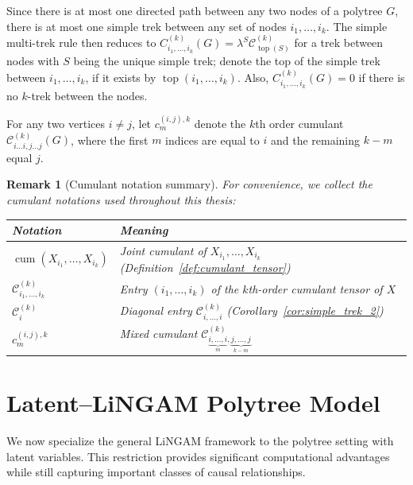 \documentclass[11pt,a4paper]{article}
\numberwithin{equation}{section}
\newtheorem{remark}[theorem]{Remark}
\DeclareMathOperator{\cum}{cum}
\DeclareMathOperator{\ttop}{top}
\begin{document}
Since there is at most one directed path between any two nodes of a polytree $G$, there is at most one simple trek between any set of nodes $i_1,\dots,i_k$. The simple multi-trek rule then reduces to $C^{(k)}_{i_1,\dots,i_k}(G)=\lambda^{S}\mathcal{C}^{(k)}_{\ttop(S)}$ for a trek between nodes with $S$ being the unique simple trek; denote the top of the simple trek between $i_1,\dots,i_k$, if it exists by $\ttop(i_1,\dots,i_k)$. Also, $C^{(k)}_{i_1,\dots,i_k}(G)=0$ if there is no $k$-trek between the nodes.

For any two vertices $i\not=j$, let $c^{(i,j),k}_m$ denote the $k$th order cumulant $\mathcal{C}^{(k)}_{{i\dots i},{j\dots j}}(G)$, where the first $m$ indices are equal to $i$ and the remaining $k-m$ equal $j$.

\begin{remark}[Cumulant notation summary]
\label{rem:notation}
For convenience, we collect the cumulant notations used throughout this thesis:
\begin{center}
\begin{tabular}{ll}
\toprule
Notation & Meaning \\
\midrule
$\cum(X_{i_1},\ldots,X_{i_k})$ & Joint cumulant of $X_{i_1},\ldots,X_{i_k}$ (Definition~\ref{def:cumulant_tensor}) \\
$\mathcal{C}^{(k)}_{i_1,\ldots,i_k}$ & Entry $(i_1,\ldots,i_k)$ of the $k$th-order cumulant tensor of $X$ \\
$\mathcal{C}^{(k)}_i$ & Diagonal entry $\mathcal{C}^{(k)}_{i,\ldots,i}$ (Corollary~\ref{cor:simple_trek_2}) \\
$c^{(i,j),k}_m$ & Mixed cumulant $\mathcal{C}^{(k)}_{\underbrace{i,\ldots,i}_{m},\underbrace{j,\ldots,j}_{k-m}}$ \\
\bottomrule
\end{tabular}
\end{center}
\end{remark}
\newcommand{\cumedge}[3]{c_{#1,#2#3}}  %
\section{Latent--LiNGAM Polytree Model}
\label{sec:model}

We now specialize the general LiNGAM framework to the polytree setting with latent variables. This restriction provides significant computational advantages while still capturing important classes of causal relationships.
\end{document}
